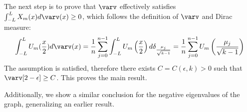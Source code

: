 \documentclass[11pt]{article}
\theoremstyle{definition}
\begin{document}
    The next step is to prove that $\varv$ effectively satisfies $\int_{-L}^{L} X_m(x) d \varv(x) \geq 0$,
    which follows the definition of $\varv$ and Dirac measure:
    $$
    \int_{-L}^L U_m(\frac{x}{2}) d\varv(x) =
        \frac{1}{n} \sum_{j=0}^{n-1} \int_{-L}^L U_m\left(\frac{x}{2}\right) d \delta_{\frac{\mu_j}{\sqrt{k-1}}} =
        \frac{1}{n} \sum_{j=0}^{n-1} U_m\left( \frac{\mu_j}{\sqrt{k-1}} \right)
    $$
    The assumption is satisfied, therefore there exists $C = C(\epsilon, k) > 0$ such that $\varv[2 - \epsilon] \geq C$.
    This proves the main result.
    \newline

    Additionally, we show a similar conclusion for the negative eigenvalues of the graph, generalizing an earlier result.
\end{document}
